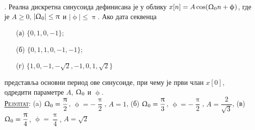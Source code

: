 \noindent\textbf{\ID}.
Реална дискретна
синусоида дефинисана је у облику 
$x[n] = A \cos(\Upomega_0 n + \upphi)$, 
где је $A\geq0$, $|\Upomega_0| \leq \uppi$ и $|\upphi|
\leq \uppi$. Ако
дата секвенца
\begin{multicols}{2}
\begin{enumerate}
\item[(а)] $\{0,1,0,-1\}$;
\item[(б)] $\{0,1,1,0,-1,-1\}$;
\item[(г)] $\{1,0,-1,-\sqrt{2}, -1, 0, 1, 
\sqrt 2 \}$ 
\end{enumerate}
\end{multicols} \noindent
представља основни период
ове синусоиде, при чему је први члан 
$x[0]$, одредити параметре 
$A$, $\Upomega_0$ и $\upphi$.
\\[2mm]

\textsc{\underline{Резултат}}:
(a) $\Upomega_0 = \dfrac{\uppi}{2}$, 
$\upphi = -\dfrac{\uppi}{2}$, 
$A = 1$,
(б) $\Upomega_0 = \dfrac{\uppi}{3}$, 
$\upphi = -\dfrac{\uppi}{2}$, 
$A = \dfrac{2}{\sqrt 3}$,
(в) $\Upomega_0 = \dfrac{\uppi}{4}$, 
$\upphi = \dfrac{\uppi}{4}$, 
$A = \sqrt2$ 